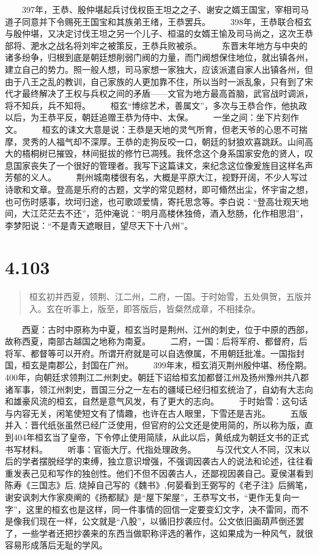 \documentclass[]{book}
\begin{document}
　　397年，王恭、殷仲堪起兵讨伐权臣王坦之之子、谢安之婿王国宝，宰相司马道子同意并下令赐死王国宝和其族弟王绪，王恭罢兵。
　　398年，王恭联合桓玄与殷仲堪，又决定讨伐王坦之另一个儿子、桓温的女婿王愉及司马尚之，这次王恭部将、淝水之战名将刘牢之被策反，王恭兵败被杀。
　　东晋末年地方与中央的诸多纷争，归根到底是朝廷想削弱门阀的力量，而门阀想保住地位，就出镇各州，建立自己的势力。照一般人想，司马家想一家独大，应该派遣自家人出镇各州，但由于八王之乱的教训，自己家族的人更加靠不住，所以当时一派乱象，只有到了宋代才最终解决了王权与兵权之间的矛盾------文官为地方最高首脑，武官战时调派，将不知兵，兵不知将。
　　桓玄``博综艺术，善属文''，多次与王恭合作，他执政以后，为王恭平反，朝廷追赠王恭为侍中、太保。
　　一坐之间：坐下片刻作文。
　　桓玄的诔文大意是说：王恭是天地的灵气所育，但老天爷的心思不可揣摩，灵秀的人福气却不深厚。王恭的走狗反咬一口，朝廷的豺狼欢喜跳跃。山间高大的梧桐树已摧毁，林间挺拔的修竹已凋残。我怀念这个身系国家安危的贤人，叹息国家丧失了一个很好的管理者。我写下这篇诔文，来纪念这位像爰旌目这样名声芳郁的义人。
　　荆州城南楼很有名，大概是平原大江，视野开阔，不少人写过诗歌和文章。登高是乐府的古题，文学的常见题材，即可翛然出尘，怀宇宙之想，也可伤时感事，坎坷归途，也可歌颂爱情，寄托思念等。李白说：``登高壮观天地间，大江茫茫去不还''，范仲淹说：``明月高楼休独倚，酒入愁肠，化作相思泪''，李梦阳说：``不是青天遮眼目，望尽天下十八州''。

\section{4.103}\label{section-278}

\begin{quote}
桓玄初并西夏，领荆、江二州，二府，一国。于时始雪，五处俱贺，五版并入。玄在听事上，版至，即答版后，皆粲然成章，不相揉杂。
\end{quote}

　　西夏：古时中原称为中夏，桓玄当时是荆州、江州的刺史，位于中原的西部，故称西夏，南部古越国之地称为南夏。
　　二府，一国：后将军府、都督府，后将军、都督等可以开府。所谓开府就是可以自选僚属，不用朝廷批准。一国指封国，桓玄是南郡公，封国在广州。
　　399年末，桓玄消灭荆州殷仲堪、杨佺期。400年，向朝廷求领荆江二州刺史。朝廷下诏给桓玄加都督江州及扬州豫州共八郡诸军事，领江州刺史，晋国三分之一左右的疆域已经归桓玄统治了，自幼有大志向和雄豪风流的桓玄，自然是意气风发，有了更大的志向。
　　于时始雪：这句话与内容无关，闲笔使短文有了情趣，也许在古人眼里，下雪还是吉兆。
　　五版并入：晋代纸张虽然已经广泛使用，但官府的公文还是使用简的，所以称为版，直到404年桓玄当了皇帝，下令停止使用简牍，从此以后，黄纸成为朝廷文书的正式书写材料。
　　听事：官衙大厅。代指处理政务。
　　与汉代文人不同，汉末以后的学者摆脱经学的束缚，独立意识增强，不强调因袭古人的说法和论述，往往看重发表己见和写作的独创性。他们不但不因袭古人，还鄙视因袭自己。夏侯湛看到陈寿《三国志》后,
烧掉自己写的《魏书》,何晏看到王弼写的《老子注》后搁笔，谢安讽刺大作家庾阐的《扬都赋》是``屋下架屋''，王恭写文书，``更作无复向一字''，这里的桓玄也是这样，同一件事情的回信一定要变幻文字，决不雷同，而不是像我们现在一样，公文就是``八股''，以循旧抄袭应付。公文依旧画葫芦倒还罢了，一些学者还把抄袭来的东西当做职称评选的著作，这如果成为一种风气，就很容易形成落后无耻的学风。
\end{document}
